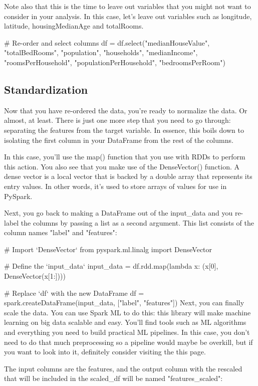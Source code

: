 \documentclass[a4paper,12pt]{article}
\begin{document}
Note also that this is the time to leave out variables that you might not want to consider in your analysis. In this case, let’s leave out variables such as longitude, latitude, housingMedianAge and totalRooms.

# Re-order and select columns
df = df.select("medianHouseValue", 
              "totalBedRooms", 
              "population", 
              "households", 
              "medianIncome", 
              "roomsPerHousehold", 
              "populationPerHousehold", 
              "bedroomsPerRoom")
\subsection*{Standardization}
Now that you have re-ordered the data, you’re ready to normalize the data. Or almost, at least. There is just one more step that you need to go through: separating the features from the target variable. In essence, this boils down to isolating the first column in your DataFrame from the rest of the columns.

In this case, you’ll use the map() function that you use with RDDs to perform this action. You also see that you make use of the DenseVector() function. A dense vector is a local vector that is backed by a double array that represents its entry values. In other words, it's used to store arrays of values for use in PySpark.

Next, you go back to making a DataFrame out of the input_data and you re-label the columns by passing a list as a second argument. This list consists of the column names "label" and "features":

# Import `DenseVector`
from pyspark.ml.linalg import DenseVector

# Define the `input_data` 
input_data = df.rdd.map(lambda x: (x[0], DenseVector(x[1:])))

# Replace `df` with the new DataFrame
df = spark.createDataFrame(input_data, ["label", "features"])
Next, you can finally scale the data. You can use Spark ML to do this: this library will make machine learning on big data scalable and easy. You’ll find tools such as ML algorithms and everything you need to build practical ML pipelines. In this case, you don’t need to do that much preprocessing so a pipeline would maybe be overkill, but if you want to look into it, definitely consider visiting the this page.

The input columns are the features, and the output column with the rescaled that will be included in the scaled_df will be named "features_scaled":
\end{document}

